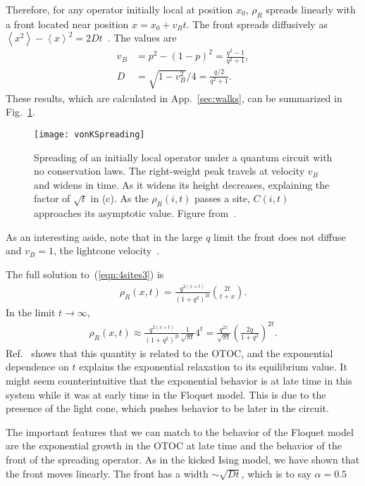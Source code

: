 \documentclass[a4paper,11pt]{article}
\renewcommand{\th}[1]{\frac{1}{#1}}
\newcommand{\ex}[1]{\left\langle #1 \right\rangle}
\newcommand{\nn}{\nonumber\\}
\begin{document}
Therefore, for any operator initially local at position $x_0$, $\rho_R$ spreads linearly with a front located near position $x = x_0 + v_B t$. The front spreads diffusively as $\ex{x^2}-\ex{x}^2=2Dt$~\cite{vonKeyserlingkHydro}. The values are
\begin{align}
v_B &= p^2-(1-p)^2 = \frac{q^2-1}{q^2+1},\nn
D   &= \sqrt{1-v_B^2}/4 = \frac{q/2}{q^2+1}. \label{eqn:Dncons}
\end{align}
These results, which are calculated in App.~\ref{sec:walks}, can be summarized in Fig.~\ref{fig:vonKSpreading}.
\begin{figure}
	\centering
	\texttt{[image: vonKSpreading]}
	\caption{Spreading of an initially local operator under a quantum circuit with no conservation laws. The right-weight peak travels at velocity $v_B$ and widens in time. As it widens its height decreases, explaining the factor of $\sqrt{t}$ in (c). As the $\rho_R(i,t)$ passes a site, $C(i,t)$ approaches its asymptotic value. Figure from~\cite{vonKeyserlingkHydro}.}
	\label{fig:vonKSpreading}
\end{figure}
As an interesting aside, note that in the large $q$ limit the front does not diffuse and $v_B=1$, the lightcone velocity~\cite{NahumOpSp}.

The full solution to~(\ref{eqn:4sites3}) is~\cite{vonKeyserlingkHydro}
\begin{align}
\rho_R(x,t) = \frac{q^{2(x+t)}}{(1+q^2)^{2t}}{2t \choose t+x}.
\end{align}
In the limit $t\to\infty$,
\begin{align}
\rho_R(x,t) \approx \frac{q^{2(x+t)}}{(1+q^2)^{2t}} \th{\sqrt{\pi t}}4^t
= \frac{q^{2x}}{\sqrt{\pi t}} \left(\frac{2q}{1+q^2}\right)^{2t}.
\end{align}
Ref.~\cite{vonKeyserlingkHydro} shows that this quantity is related to the OTOC, and the exponential dependence on $t$ explains the exponential relaxation to its equilibrium value. It might seem counterintuitive that the exponential behavior is at late time in this system while it was at early time in the Floquet model. This is due to the presence of the light cone, which pushes behavior to be later in the circuit.

The important features that we can match to the behavior of the Floquet model are the exponential growth in the OTOC at late time and the behavior of the front of the spreading operator. As in the kicked Ising model, we have shown that the front moves linearly. The front has a width $\sim \sqrt{Dt}$, which is to say $\alpha=0.5$
\end{document}

